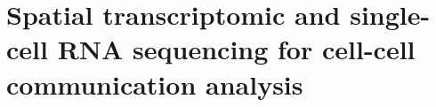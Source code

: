 \cleartoevenpage
\pagestyle{empty}	

\chapter[Spatial transcriptomic and single-cell RNA sequencing for cell-cell communication analysis]{Spatial transcriptomic and single-cell RNA sequencing for cell-cell communication analysis}
\label{Chap:2}	%
\pagestyle{headings}
